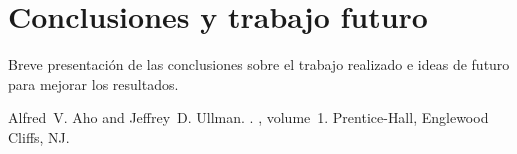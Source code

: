 \documentclass[11pt,a4paper]{article}
\begin{document}
\section{Conclusiones y trabajo futuro}

Breve presentaci\'on de las conclusiones sobre  el trabajo realizado e ideas de futuro para mejorar los resultados.


\begin{thebibliography}{}

Alfred~V. Aho and Jeffrey~D. Ullman.
.
, volume~1.
\newblock Prentice-{Hall}, Englewood Cliffs, NJ.

\end{thebibliography}
\end{document}
